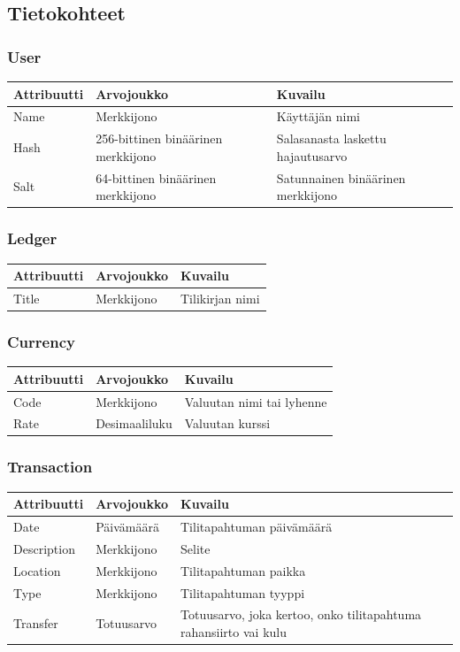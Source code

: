 \documentclass[a4paper,parskip=half]{scrartcl}
\begin{document}
\subsection{Tietokohteet}

\subsubsection{User}
\begin{tabular}{ | l | l | l | }
  \hline
  \textbf{Attribuutti} & \textbf{Arvojoukko} & \textbf{Kuvailu} \\ \hline
  Name & Merkkijono & Käyttäjän nimi \\ \hline
  Hash & 256-bittinen binäärinen merkkijono &
    Salasanasta laskettu hajautusarvo
    \\ \hline
  Salt & 64-bittinen binäärinen merkkijono & Satunnainen binäärinen merkkijono
    \\ \hline
\end{tabular}

\subsubsection{Ledger}
\begin{tabular}{ | l | l | l | }
  \hline
  \textbf{Attribuutti} & \textbf{Arvojoukko} & \textbf{Kuvailu} \\ \hline
  Title & Merkkijono & Tilikirjan nimi \\ \hline
\end{tabular}

\subsubsection{Currency}
\begin{tabular}{ | l | l | l | }
  \hline
  \textbf{Attribuutti} & \textbf{Arvojoukko} & \textbf{Kuvailu} \\ \hline
  Code & Merkkijono & Valuutan nimi tai lyhenne \\ \hline
  Rate & Desimaaliluku & Valuutan kurssi \\ \hline
\end{tabular}

\subsubsection{Transaction}
\begin{tabular}{ | l | l | l | }
  \hline
  \textbf{Attribuutti} & \textbf{Arvojoukko} & \textbf{Kuvailu} \\ \hline
  Date & Päivämäärä & Tilitapahtuman päivämäärä \\ \hline
  Description & Merkkijono & Selite \\ \hline
  Location & Merkkijono & Tilitapahtuman paikka \\ \hline
  Type & Merkkijono & Tilitapahtuman tyyppi \\ \hline
  Transfer & Totuusarvo & Totuusarvo, joka kertoo, onko tilitapahtuma
    rahansiirto vai kulu \\ \hline
\end{tabular}
\end{document}
